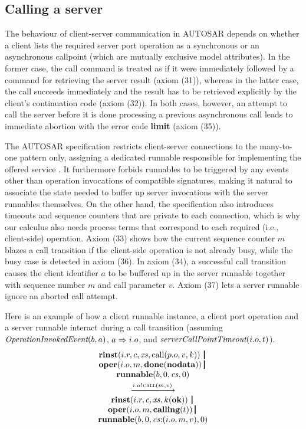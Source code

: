 \documentclass[10pt,conference]{IEEEtran}
\begin{document}
\subsection{Calling a server} \label{sect:Call}

The behaviour of client-server communication in AUTOSAR \cite[ch.~4.3.2]{AR:RTE} depends on whether a client lists the required server port operation as a synchronous or an asynchronous callpoint (which are mutually exclusive model attributes). In the former case, the call command is treated as if it were immediately followed by a command for retrieving the server result (axiom (31)), whereas in the latter case, the call succeeds immediately and the result has to be retrieved explicitly by the client's continuation code (axiom (32)). In both cases, however, an attempt to call the server before it is done processing a previous asynchronous call leads to immediate abortion with the error code \textbf{limit} (axiom (35)).

The AUTOSAR specification restricts client-server connections to the many-to-one pattern only, assigning a dedicated runnable responsible for implementing the offered service \cite[ch.~4.3.2]{AR:SWC}. It furthermore forbids runnables to be triggered by any events other than operation invocations of compatible signatures, making it natural to associate the state needed to buffer up server invocations with the server runnables themselves. On the other hand, the specification also introduces timeouts \cite[ch.~4.3.2.3]{AR:RTE} and sequence counters \cite[ch.~4.3.2.6.1]{AR:RTE} that are private to each connection, which is why our calculus also needs process terms that correspond to each required (i.e., client-side) operation. Axiom (33) shows how the current sequence counter $m$ blazes a call transition if the client-side operation is not already busy, while the busy case is detected in axiom (36). In axiom (34), a successful call transition causes the client identifier $a$ to be buffered up in the server runnable together with sequence number $m$ and call parameter $v$. Axiom (37) lets a server runnable ignore an aborted call attempt.

Here is an example of how a client runnable instance, a client port operation and a server runnable interact during a call transition (assuming $\emph{OperationInvokedEvent}(b,a)$, $a \Rightarrow i.o$, and $\emph{serverCallPointTimeout}(i.o,t) $).
$$
\begin{array}{c}
  {\Trinst {i.r} c \Xs {\TrteCall {p.o} v k}} \,\Opar  \\
  {\Toper {i.o} m {\Tdone \Tnodata}} \Opar \\
  {\Trunnable b 0 \Cs 0} \vspace{0.6ex} \\
  \red{\say{i.o}{\Tcall m v}} \\
  {\Trinst {i.r} c \Xs {\Tap k \Tok}} \,\Opar \\
  {\Toper {i.o} m {\Tcalling t}} \Opar \\
  {\Trunnable b 0 {\Tcons \Cs {\Tclient {i.o} m v}}  0}
\end{array}
$$
\end{document}
